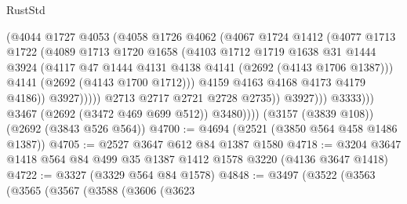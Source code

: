 \begin{lexlean}{RustStd}
\begin{coremodule}
                                (@4044
                                  @1727
                                  @4053
                                  (@4058
                                    @1726
                                    @4062
                                    (@4067
                                      @1724
                                      @1412
                                      (@4077
                                        @1713
                                        @1722
                                        (@4089
                                          @1713
                                          @1720
                                          @1658
                                          (@4103
                                            @1712
                                            @1719
                                            @1638
                                            @31
                                            @1444
                                            @3924
                                            (@4117
                                              @47
                                              @1444
                                              @4131
                                              @4138
                                              @4141
                                              (@2692 (@4143 @1706 @1387)))
                                            @4141
                                            (@2692 (@4143 @1700 @1712)))
                                          @4159
                                          @4163
                                          @4168
                                          @4173
                                          @4179
                                          @4186))
                                      @3927)))))
                            @2713
                            @2717
                            @2721
                            @2728
                            @2735))
                        @3927)))
                  @3333)))
            @3467
            (@2692 (@3472 @469 @699 @512))
            @3480))))
    (@3157 (@3839 @108))
    (@2692 (@3843 @526 @564))
@4700 := @4694 (@2521 (@3850 @564 @458 @1486 @1387))
@4705 := @2527 @3647 @612 @84 @1387 @1580
@4718 := @3204 @3647 @1418 @564 @84 @499 @35 @1387 @1412 @1578 @3220 (@4136 @3647 @1418)
@4722 := @3327 (@3329 @564 @84 @1578)
@4848 := @3497
    (@3522
      (@3563
        (@3565
          (@3567
            (@3588
              (@3606
                (@3623

\end{coremodule}
\end{lexlean}
